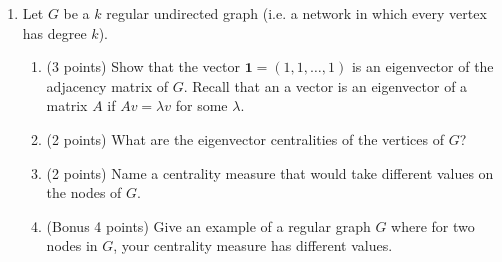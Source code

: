 \documentclass[a4paper,10pt]{article}
\begin{document}
\begin{enumerate}
\item Let $G$ be a $k$ regular undirected graph (i.e. a network in which every vertex has degree $k$).
\begin{enumerate}
\item (3 points) Show that the vector $\mathbf{1} = (1, 1, \ldots, 1)$ is an eigenvector of the adjacency matrix of $G$. Recall that
an a vector is an eigenvector of a matrix $A$ if $Av = \lambda v$ for some $\lambda$. 
\item (2 points) What are the eigenvector centralities of the vertices of $G$?
\item (2 points) Name a centrality measure that would take different values on the nodes of $G$. 
\item (Bonus 4 points) Give an example of a regular graph $G$ where for two nodes in $G$, your centrality measure has different values. 
\end{enumerate}




\end{enumerate}
\end{document}
